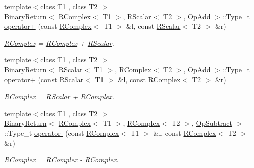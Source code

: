 \begin{DoxyCompactItemize}
{\footnotesize template$<$class T1 , class T2 $>$ }\\\mbox{\hyperlink{structENSEM_1_1BinaryReturn}{Binary\+Return}}$<$ \mbox{\hyperlink{classENSEM_1_1RComplex}{R\+Complex}}$<$ T1 $>$, \mbox{\hyperlink{classENSEM_1_1RScalar}{R\+Scalar}}$<$ T2 $>$, \mbox{\hyperlink{structENSEM_1_1OpAdd}{Op\+Add}} $>$\+::Type\+\_\+t \mbox{\hyperlink{group__rcomplex_gacf34d655d02ee81a131842116e13d950}{operator+}} (const \mbox{\hyperlink{classENSEM_1_1RComplex}{R\+Complex}}$<$ T1 $>$ \&l, const \mbox{\hyperlink{classENSEM_1_1RScalar}{R\+Scalar}}$<$ T2 $>$ \&r)
\begin{DoxyCompactList}\small\item\em \mbox{\hyperlink{classENSEM_1_1RComplex}{R\+Complex}} = \mbox{\hyperlink{classENSEM_1_1RComplex}{R\+Complex}} + \mbox{\hyperlink{classENSEM_1_1RScalar}{R\+Scalar}}. \end{DoxyCompactList}\item 
{\footnotesize template$<$class T1 , class T2 $>$ }\\\mbox{\hyperlink{structENSEM_1_1BinaryReturn}{Binary\+Return}}$<$ \mbox{\hyperlink{classENSEM_1_1RScalar}{R\+Scalar}}$<$ T1 $>$, \mbox{\hyperlink{classENSEM_1_1RComplex}{R\+Complex}}$<$ T2 $>$, \mbox{\hyperlink{structENSEM_1_1OpAdd}{Op\+Add}} $>$\+::Type\+\_\+t \mbox{\hyperlink{group__rcomplex_gad42347a2cdf1648efaec65d4b0f51651}{operator+}} (const \mbox{\hyperlink{classENSEM_1_1RScalar}{R\+Scalar}}$<$ T1 $>$ \&l, const \mbox{\hyperlink{classENSEM_1_1RComplex}{R\+Complex}}$<$ T2 $>$ \&r)
\begin{DoxyCompactList}\small\item\em \mbox{\hyperlink{classENSEM_1_1RComplex}{R\+Complex}} = \mbox{\hyperlink{classENSEM_1_1RScalar}{R\+Scalar}} + \mbox{\hyperlink{classENSEM_1_1RComplex}{R\+Complex}}. \end{DoxyCompactList}\item 
{\footnotesize template$<$class T1 , class T2 $>$ }\\\mbox{\hyperlink{structENSEM_1_1BinaryReturn}{Binary\+Return}}$<$ \mbox{\hyperlink{classENSEM_1_1RComplex}{R\+Complex}}$<$ T1 $>$, \mbox{\hyperlink{classENSEM_1_1RComplex}{R\+Complex}}$<$ T2 $>$, \mbox{\hyperlink{structENSEM_1_1OpSubtract}{Op\+Subtract}} $>$\+::Type\+\_\+t \mbox{\hyperlink{group__rcomplex_ga49dbda9bd7d00d928595979502979d9b}{operator-\/}} (const \mbox{\hyperlink{classENSEM_1_1RComplex}{R\+Complex}}$<$ T1 $>$ \&l, const \mbox{\hyperlink{classENSEM_1_1RComplex}{R\+Complex}}$<$ T2 $>$ \&r)
\begin{DoxyCompactList}\small\item\em \mbox{\hyperlink{classENSEM_1_1RComplex}{R\+Complex}} = \mbox{\hyperlink{classENSEM_1_1RComplex}{R\+Complex}} -\/ \mbox{\hyperlink{classENSEM_1_1RComplex}{R\+Complex}}. \end{DoxyCompactList}\item 

\end{DoxyCompactItemize}
